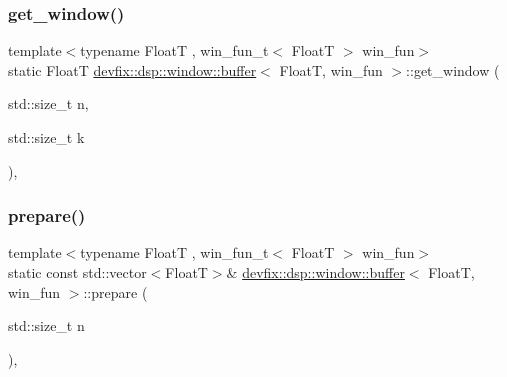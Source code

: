 \mbox{\label{structdevfix_1_1dsp_1_1window_1_1buffer_a877f872e06b4709189e15c38f247445f}} 
\subsubsection{\texorpdfstring{get\+\_\+window()}{get\_window()}}
{\footnotesize\ttfamily template$<$typename FloatT , win\+\_\+fun\+\_\+t$<$ Float\+T $>$ win\+\_\+fun$>$ \\
static FloatT \hyperlink{structdevfix_1_1dsp_1_1window_1_1buffer}{devfix\+::dsp\+::window\+::buffer}$<$ FloatT, win\+\_\+fun $>$\+::get\+\_\+window (\begin{DoxyParamCaption}\item[{std\+::size\+\_\+t}]{n,  }\item[{std\+::size\+\_\+t}]{k }\end{DoxyParamCaption})\hspace{0.3cm}{\ttfamily [inline]}, {\ttfamily [static]}}

\mbox{\label{structdevfix_1_1dsp_1_1window_1_1buffer_a3ace062676326a9981118d53b8ba5900}} 
\subsubsection{\texorpdfstring{prepare()}{prepare()}}
{\footnotesize\ttfamily template$<$typename FloatT , win\+\_\+fun\+\_\+t$<$ Float\+T $>$ win\+\_\+fun$>$ \\
static const std\+::vector$<$FloatT$>$\& \hyperlink{structdevfix_1_1dsp_1_1window_1_1buffer}{devfix\+::dsp\+::window\+::buffer}$<$ FloatT, win\+\_\+fun $>$\+::prepare (\begin{DoxyParamCaption}\item[{std\+::size\+\_\+t}]{n }\end{DoxyParamCaption})\hspace{0.3cm}{\ttfamily [inline]}, {\ttfamily [static]}}


